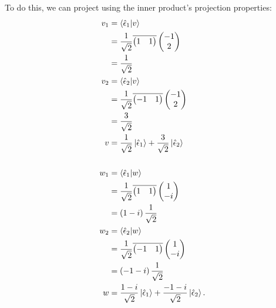 \documentclass[10pt]{mypackage}
\begin{document}
\begin{example}
To do this, we can project using the inner product's projection properties:
\begin{align*}
  v_1 &= \braket{\hat{\epsilon}_1}{v}\\
      &= \frac{1}{\sqrt{2}} \overline{\begin{pmatrix}1 & 1\end{pmatrix}} \begin{pmatrix}-1\\2\end{pmatrix}\\
      &= \frac{1}{\sqrt{2}}\\
  v_2 &= \braket{\hat{\epsilon}_2}{v}\\
      &= \frac{1}{\sqrt{2}}\overline{ \begin{pmatrix}-1 & 1\end{pmatrix} } \begin{pmatrix}-1\\2\end{pmatrix}\\
      &= \frac{3}{\sqrt{2}}\\
  v &= \frac{1}{\sqrt{2}}\ket{\hat{\epsilon}_1} + \frac{3}{\sqrt{2}}\ket{\hat{\epsilon}_2}\\
  \\
  w_1 &= \braket{\hat{\epsilon}_1}{w}\\
      &= \frac{1}{\sqrt{2}} \overline{ \begin{pmatrix}1 & 1\end{pmatrix} } \begin{pmatrix}1\\-i\end{pmatrix}\\
      &= \left(1-i\right)\frac{1}{\sqrt{2}}\\
  w_2 &= \braket{\hat{\epsilon}_2}{w}\\
      &= \frac{1}{\sqrt{2}} \overline{ \begin{pmatrix}-1 & 1\end{pmatrix} } \begin{pmatrix}1\\-i\end{pmatrix}\\
      &= \left(-1-i\right)\frac{1}{\sqrt{2}}\\
  w &= \frac{1-i}{\sqrt{2}}\ket{\hat{\epsilon}_1} + \frac{-1-i}{\sqrt{2}}\ket{\hat{\epsilon}_2}.
\end{align*}
\end{example}
\end{document}
